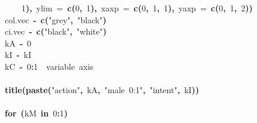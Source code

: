 \documentclass{article}
\makeatletter
\newcommand{\hlnumber}[1]{\textcolor[rgb]{0,0,0}{#1}}%
\newcommand{\hlfunctioncall}[1]{\textcolor[rgb]{.5,0,.33}{\textbf{#1}}}%
\newcommand{\hlstring}[1]{\textcolor[rgb]{.6,.6,1}{#1}}%
\newcommand{\hlkeyword}[1]{\textbf{#1}}%
\newcommand{\hlargument}[1]{\textcolor[rgb]{.69,.25,.02}{#1}}%
\newcommand{\hlcomment}[1]{\textcolor[rgb]{.18,.6,.34}{#1}}%
\newcommand{\hlassignement}[1]{\textbf{#1}}%
\newcommand{\hlsymbol}[1]{#1}%
\newcommand{\hlstd}[1]{\textcolor[rgb]{0,0,0}{#1}}%
\newenvironment{kframe}{%
 \def\FrameCommand##1{\hskip\@totalleftmargin \hskip-\fboxsep
 \colorbox{shadecolor}{##1}\hskip-\fboxsep
     \hskip-\linewidth \hskip-\@totalleftmargin \hskip\columnwidth}%
 \MakeFramed {\advance\hsize-\width
   \@totalleftmargin\z@ \linewidth\hsize
   \@setminipage}}%
 {\par\unskip\endMakeFramed}
\newenvironment{knitrout}{}{} %
\makeatother
\begin{document}
\begin{knitrout}
{\begin{kframe}
\begin{flushleft}
\hlstd{}{\ }{\ }{\ }{\ }{\ }{\ }{\ }{\ }\hlnumber{1}\hlkeyword{)}\hlkeyword{,}{\ }\hlargument{ylim}{\ }\hlargument{=}{\ }\hlfunctioncall{c}\hlkeyword{(}\hlnumber{0}\hlkeyword{,}{\ }\hlnumber{1}\hlkeyword{)}\hlkeyword{,}{\ }\hlargument{xaxp}{\ }\hlargument{=}{\ }\hlfunctioncall{c}\hlkeyword{(}\hlnumber{0}\hlkeyword{,}{\ }\hlnumber{1}\hlkeyword{,}{\ }\hlnumber{1}\hlkeyword{)}\hlkeyword{,}{\ }\hlargument{yaxp}{\ }\hlargument{=}{\ }\hlfunctioncall{c}\hlkeyword{(}\hlnumber{0}\hlkeyword{,}{\ }\hlnumber{1}\hlkeyword{,}{\ }\hlnumber{2}\hlkeyword{)}\hlkeyword{)}\hspace*{\fill}\\
\hlstd{}{\ }{\ }{\ }{\ }\hlsymbol{col.vec}{\ }\hlassignement{\usebox{\hlnormalsizeboxlessthan}-}{\ }\hlfunctioncall{c}\hlkeyword{(}\hlstring{"grey"}\hlkeyword{,}{\ }\hlstring{"black"}\hlkeyword{)}\hspace*{\fill}\\
\hlstd{}{\ }{\ }{\ }{\ }\hlsymbol{ci.vec}{\ }\hlassignement{\usebox{\hlnormalsizeboxlessthan}-}{\ }\hlfunctioncall{c}\hlkeyword{(}\hlstring{"black"}\hlkeyword{,}{\ }\hlstring{"white"}\hlkeyword{)}\hspace*{\fill}\\
\hlstd{}{\ }{\ }{\ }{\ }\hlsymbol{kA}{\ }\hlassignement{\usebox{\hlnormalsizeboxlessthan}-}{\ }\hlnumber{0}\hspace*{\fill}\\
\hlstd{}{\ }{\ }{\ }{\ }\hlsymbol{kI}{\ }\hlassignement{\usebox{\hlnormalsizeboxlessthan}-}{\ }\hlsymbol{kI}\hspace*{\fill}\\
\hlstd{}{\ }{\ }{\ }{\ }\hlsymbol{kC}{\ }\hlassignement{\usebox{\hlnormalsizeboxlessthan}-}{\ }\hlnumber{0}\hlkeyword{:}\hlnumber{1}{\ }{\ }\hlcomment{\usebox{\hlnormalsizeboxhash}\usebox{\hlnormalsizeboxhash}{\ }variable{\ }axis}\hspace*{\fill}\\
\hlstd{}\hspace*{\fill}\\
\hlstd{}{\ }{\ }{\ }{\ }\hlfunctioncall{title}\hlkeyword{(}\hlfunctioncall{paste}\hlkeyword{(}\hlstring{"action"}\hlkeyword{,}{\ }\hlsymbol{kA}\hlkeyword{,}{\ }\hlstring{"male{\ }0:1"}\hlkeyword{,}{\ }\hlstring{"intent"}\hlkeyword{,}{\ }\hlsymbol{kI}\hlkeyword{)}\hlkeyword{)}\hspace*{\fill}\\
\hlstd{}\hspace*{\fill}\\
\hlstd{}{\ }{\ }{\ }{\ }\hlkeyword{for}{\ }\hlkeyword{(}\hlsymbol{kM}{\ }\hlkeyword{in}{\ }\hlnumber{0}\hlkeyword{:}\hlnumber{1}\hlkeyword{)}{\ }\hlkeyword{\usebox{\hlnormalsizeboxopenbrace}}\hspace*{\fill}\\

\end{flushleft}
\end{kframe}}
\end{knitrout}
\end{document}
